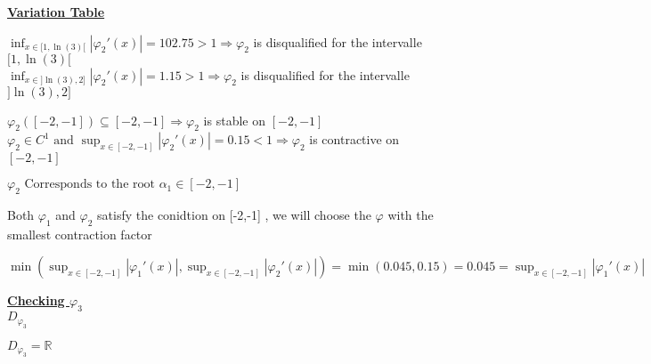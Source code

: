 \vspace{1cm}
\textbf{\underline{Variation Table}}

\begin{center}
\end{center}
\vspace{0.25cm}

\vspace{0.25cm}

\(\displaystyle\inf_{x \in [1,\ln{(3)}[} |\varphi_2'(x)| = 102.75 > 1 \Longrightarrow \varphi_2\) is disqualified 
for the intervalle \([1,\ln{(3)}[\)\\[0.15cm]
\(\displaystyle\inf_{x \in ]\ln{(3)},2]} |\varphi_2'(x)| = 1.15 > 1 \Longrightarrow \varphi_2\) is disqualified 
for the intervalle \(]\ln{(3)},2]\)

\vspace{0.5cm}
\(\varphi_2([-2,-1]) \subseteq [-2,-1] \Longrightarrow \varphi_2\) is stable on \([-2,-1]\)\\[0.1cm]
\( \varphi_2 \in C^{1} \text{ and } \displaystyle\sup_{x \in [-2, -1]} |\varphi_2'(x)| = 0.15 < 1 \Longrightarrow \varphi_2\) is contractive on \([-2,-1]\)

\begin{center}
    \(\boxed{\varphi_2 \text{ Corresponds to the root } \alpha_1 \in [-2,-1]}\)
\end{center}

\newpage
Both \(\varphi_1\) and \(\varphi_2\) satisfy the conidtion on [-2,-1] , we will choose the 
\(\varphi\) with the smallest contraction factor
\begin{center}
    \(\min \left( \displaystyle\sup_{x \in [-2, -1]} |\varphi_1'(x)| ,  \displaystyle\sup_{x \in [-2, -1]} |\varphi_2'(x)|\right) = 
\min \left( 0.045  , 0.15 \right) = 0.045 =
    \displaystyle\sup_{x \in [-2, -1]} |\varphi_1'(x)| \)
\end{center}

\vspace{1cm}
\textbf{\underline{Checking \(\varphi_3\)}}\\[0.15cm]
\textbf{\underline{\(D_{\varphi_3}\)}}
\begin{center}
    \( \boxed{D_{\varphi_3} = \mathbb{R}}\)
\end{center}

